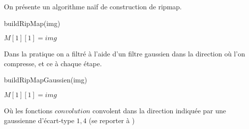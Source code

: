 
On présente un algorithme naïf de construction de ripmap.
\medbreak
\medbreak
\begin{algorithm}[H]
\caption{buildRipMap(img)}
$M[1][1] = img$\;

\end{algorithm}
\medbreak
\medbreak
Dans la pratique on a filtré à l'aide d'un filtre gaussien dans la direction où l'on compresse, et ce à chaque étape.
\medbreak
\medbreak
\begin{algorithm}[H]
\caption{buildRipMapGaussien(img)}
$M[1][1] = img$\;

\end{algorithm}
\medbreak
\medbreak
Où les fonctions $convolution$ convolent dans la direction indiquée par une gaussienne d'écart-type $1,4$ (se reporter à \cite{morel2011sift})


